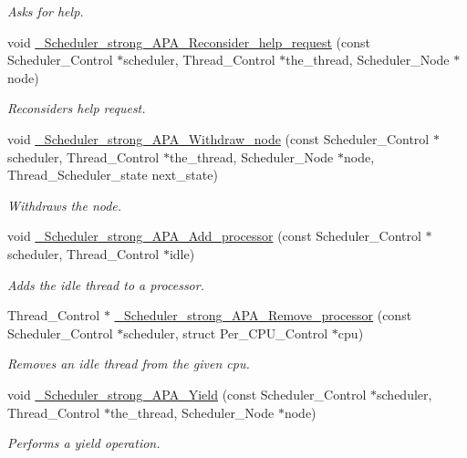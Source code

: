 \begin{DoxyCompactItemize}
\begin{DoxyCompactList}\small\item\em Asks for help. \end{DoxyCompactList}\item 
void \hyperlink{group__RTEMSScoreSchedulerStrongAPA_ga7809e64065ec5d291f3dc82220a68d3f}{\+\_\+\+Scheduler\+\_\+strong\+\_\+\+A\+P\+A\+\_\+\+Reconsider\+\_\+help\+\_\+request} (const Scheduler\+\_\+\+Control $\ast$scheduler, Thread\+\_\+\+Control $\ast$the\+\_\+thread, Scheduler\+\_\+\+Node $\ast$node)
\begin{DoxyCompactList}\small\item\em Reconsiders help request. \end{DoxyCompactList}\item 
void \hyperlink{group__RTEMSScoreSchedulerStrongAPA_gaf43eb65a6fbbe2826ca4cec68a930cb5}{\+\_\+\+Scheduler\+\_\+strong\+\_\+\+A\+P\+A\+\_\+\+Withdraw\+\_\+node} (const Scheduler\+\_\+\+Control $\ast$scheduler, Thread\+\_\+\+Control $\ast$the\+\_\+thread, Scheduler\+\_\+\+Node $\ast$node, Thread\+\_\+\+Scheduler\+\_\+state next\+\_\+state)
\begin{DoxyCompactList}\small\item\em Withdraws the node. \end{DoxyCompactList}\item 
void \hyperlink{group__RTEMSScoreSchedulerStrongAPA_ga6ac09dac24785561fd7c5ee5bbd8f5ca}{\+\_\+\+Scheduler\+\_\+strong\+\_\+\+A\+P\+A\+\_\+\+Add\+\_\+processor} (const Scheduler\+\_\+\+Control $\ast$scheduler, Thread\+\_\+\+Control $\ast$idle)
\begin{DoxyCompactList}\small\item\em Adds the idle thread to a processor. \end{DoxyCompactList}\item 
Thread\+\_\+\+Control $\ast$ \hyperlink{group__RTEMSScoreSchedulerStrongAPA_gac83f4ab63b404cdfea31e572fa9590a5}{\+\_\+\+Scheduler\+\_\+strong\+\_\+\+A\+P\+A\+\_\+\+Remove\+\_\+processor} (const Scheduler\+\_\+\+Control $\ast$scheduler, struct Per\+\_\+\+C\+P\+U\+\_\+\+Control $\ast$cpu)
\begin{DoxyCompactList}\small\item\em Removes an idle thread from the given cpu. \end{DoxyCompactList}\item 
void \hyperlink{group__RTEMSScoreSchedulerStrongAPA_ga0720c2d79f2b6dd8e91d19879f72b8c7}{\+\_\+\+Scheduler\+\_\+strong\+\_\+\+A\+P\+A\+\_\+\+Yield} (const Scheduler\+\_\+\+Control $\ast$scheduler, Thread\+\_\+\+Control $\ast$the\+\_\+thread, Scheduler\+\_\+\+Node $\ast$node)
\begin{DoxyCompactList}\small\item\em Performs a yield operation. \end{DoxyCompactList}\end{DoxyCompactItemize}
